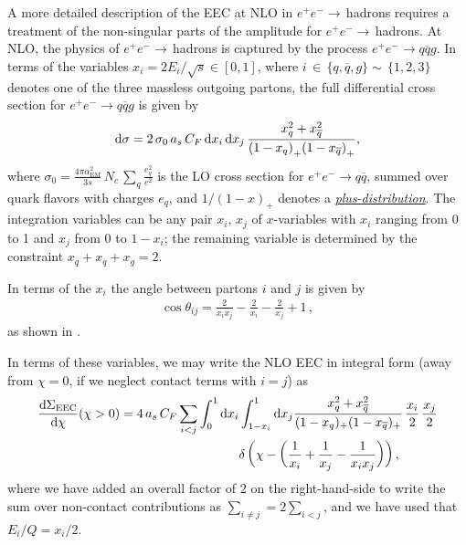 
A more detailed description of the EEC at NLO in \(e^+e^-\to\,\)hadrons requires a treatment of the non-singular parts of the amplitude for \(e^+ e^- \to\,\)hadrons.
%
At NLO, the physics of \(e^+ e^- \to\,\)hadrons is captured by the process \(e^+ e^- \to q \overline{q} g\).
%
In terms of the variables \(x_i = 2 E_i / \sqrt{s} \in [0, 1]\), where \(i\,\in\,\{q,\overline{q},g\}\sim\,\{1,2,3\}\) denotes one of the three massless outgoing partons, the full differential cross section for \(e^+e^-\to q \overline{q} g\) is given by
\begin{align}
    \dd \sigma
    =
    2\,\sigma_0
    \,
    a_s \, C_F
    \,
    \dd x_i\,\dd x_j
    \,
    \frac{x_q^2 + x_{\overline{q}}^2}{
          {(1-x_q)}_+
          {(1-x_{\overline{q}})}_+
    }
    ,
\end{align}
where \(
    \sigma_0 =
    \frac{4\pi \alpha_{\text{EM}}^2}{3 s}
    \,N_c\,\sum_q \frac{e_q^2}{e^2}
\)
is the LO cross section for \(e^+e^-\to q \overline{q}\), summed over quark flavors with charges \(e_q\), and \(1/{(1-x)}_+\) denotes a \hyperlink{footnote:plusfn_defn}{\textit{plus-distribution}}.
%
The integration variables can be any pair \(x_i,\,x_j\) of \(x\)-variables with \(x_i\) ranging from 0 to 1 and \(x_j\) from 0 to \(1-x_i\);
%
the remaining variable is determined by the constraint \(x_q + x_{\overline{q}} + x_g = 2\).

In terms of the \(x_i\) the angle between partons \(i\) and \(j\) is given by
\begin{align}
    \cos\theta_{ij} = \frac{2}{x_i x_j} - \frac{2}{x_i} - \frac{2}{x_j} + 1
    \,,
\end{align}
as shown in .

In terms of these variables, we may write the NLO EEC in integral form (away from \(\chi = 0\), if we neglect contact terms with \(i=j\)) as
\begin{align}
    \label{eq:ee2hadrons_EEC}
    \frac{\dd\Sigma_\text{EEC}}{\dd\chi}
    (\chi>0)
    =
    4\,
    \ascf
    \sum_{i<j}
    \int_0^1 \dd x_i
    &
    \int_{1-x_i}^1 \dd x_j
    \frac{x_q^2 + x_{\overline{q}}^2}{(1-x_q)_+(1-x_{\overline{q}})_+}
    \,\frac{x_i}{2}
    \,\frac{x_j}{2}
    \\
    &
    \notag
    \delta\le(
        \chi
        -
        \le(
            \frac{1}{x_i} + \frac{1}{x_j} - \frac{1}{x_i x_j}
        \ri)
    \ri)
    ,
\end{align}
where we have added an overall factor of \(2\) on the right-hand-side to write the sum over non-contact contributions as \(\sum_{i \neq j} = 2 \sum_{i < j}\), and we have used that \(E_i/Q = x_i / 2\).

